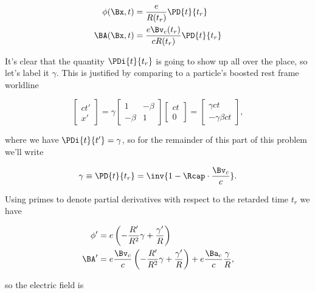 \begin{align}\label{eqn:relElectroDynProblemSet5:n}
\phi(\Bx, t) &= \frac{e}{R(t_r)} \PD{t}{t_r} \\
\BA(\Bx, t) &= \frac{e \Bv_c(t_r)}{c R(t_r)} \PD{t}{t_r}
\end{align}

It's clear that the quantity $\PDi{t}{t_r}$ is going to show up all over the place, so let's label it $\gamma$.  This is justified by comparing to a particle's boosted rest frame worldline

\begin{equation}\label{eqn:relElectroDynProblemSet5:260}
\begin{bmatrix}
c t' \\
x'
\end{bmatrix}
=
\gamma
\begin{bmatrix}
1 & -\beta \\
-\beta & 1
\end{bmatrix}
\begin{bmatrix}
c t \\
0
\end{bmatrix}
= 
\begin{bmatrix}
\gamma c t \\
-\gamma \beta c t
\end{bmatrix},
\end{equation}

where we have $\PDi{t}{t'} = \gamma$, so for the remainder of this part of this problem we'll write

\begin{equation}\label{eqn:relElectroDynProblemSet5:280}
\gamma \equiv \PD{t}{t_r} = \inv{ 1 -\Rcap \cdot \frac{\Bv_c}{c} }.
\end{equation}

Using primes to denote partial derivatives with respect to the retarded time $t_r$ we have

\begin{align}\label{eqn:relElectroDynProblemSet5:n}
\phi' &= e \left( -\frac{R'}{R^2} \gamma + \frac{\gamma'}{R} \right) \\
\BA' &= e \frac{\Bv_c}{c} \left( -\frac{R'}{R^2} \gamma + \frac{\gamma'}{R} \right)
+ e \frac{\Ba_c}{c} \frac{\gamma}{R},
\end{align}

so the electric field is

